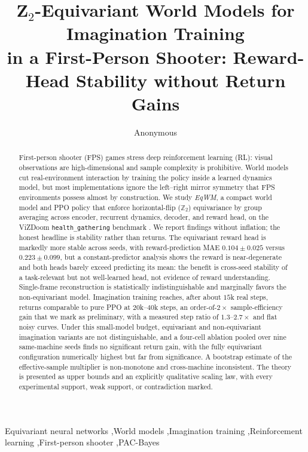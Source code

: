 \documentclass[preprint,12pt]{elsarticle}
\begin{document}
\begin{frontmatter}

\title{Z$_2$-Equivariant World Models for Imagination Training\\
in a First-Person Shooter: Reward-Head Stability without Return Gains}

\author[1]{Anonymous}
\address[1]{Anonymous Institution (double-blind review)}

\begin{abstract}
First-person shooter (FPS) games stress deep reinforcement learning (RL):
visual observations are high-dimensional and sample complexity is
prohibitive. World models cut real-environment interaction by training the
policy inside a learned dynamics model, but most implementations ignore the
left--right mirror symmetry that FPS environments possess almost by
construction. We study \emph{EqWM}, a compact world model and PPO policy that
enforce horizontal-flip ($\mathbb Z_2$) equivariance by group averaging across
encoder, recurrent dynamics, decoder, and reward head, on the ViZDoom
\texttt{health\_gathering} benchmark \cite{vizdoom2016}. We report findings
without inflation; the honest headline is stability rather than returns. The
equivariant reward head is markedly more stable across seeds, with
reward-prediction MAE $0.104\pm0.025$ versus $0.223\pm0.099$, but a
constant-predictor analysis shows the reward is near-degenerate and both
heads barely exceed predicting its mean: the benefit is cross-seed stability
of a task-relevant but not well-learned head, not evidence of reward
understanding. Single-frame reconstruction is statistically indistinguishable
and marginally favors the non-equivariant model. Imagination training reaches,
after about $15$k real steps, returns comparable to pure PPO at $20$k--$40$k
steps, an order-of-$2\times$ sample-efficiency gain that we mark as
preliminary, with a measured step ratio of $1.3$--$2.7\times$ and flat noisy
curves. Under this small-model budget, equivariant and non-equivariant
imagination variants are not distinguishable, and a four-cell ablation pooled
over nine same-machine seeds finds no significant return gain, with the fully
equivariant configuration numerically highest but far from significance. A
bootstrap estimate of the effective-sample multiplier is non-monotone and
cross-machine inconsistent. The theory is presented as upper bounds and an
explicitly qualitative scaling law, with every experimental support, weak
support, or contradiction marked.
\end{abstract}

\begin{keyword}
Equivariant neural networks \sep World models \sep Imagination training \sep Reinforcement learning \sep First-person shooter \sep PAC-Bayes
\end{keyword}

\end{frontmatter}
\end{document}
